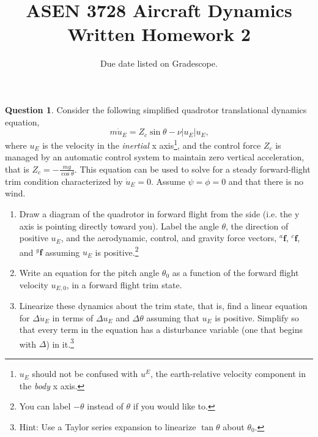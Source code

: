 \documentclass{article}
\title{ASEN 3728 Aircraft Dynamics\\Written Homework 2}
\date{Due date listed on Gradescope.}
\theoremstyle{definition}
\newtheorem{question}{Question}
\begin{document}

\maketitle

\begin{question}
    Consider the following simplified quadrotor translational dynamics equation,
    \begin{equation*}
        m\dot{u}_E = Z_c\sin\theta-\nu |u_E| u_E \text{,}
    \end{equation*}
    where $u_E$ is the velocity in the \emph{inertial} x axis\footnote{$u_E$ should not be confused with $u^E$, the earth-relative velocity component in the \emph{body} x axis.}, and the control force $Z_c$ is managed by an automatic control system to maintain zero vertical acceleration, that is $Z_c=-\frac{mg}{\cos\theta}$. This equation can be used to solve for a steady forward-flight trim condition characterized by $\dot{u}_E = 0$. Assume $\psi=\phi=0$ and that there is no wind.

\begin{enumerate}[label=\alph*),nosep]
    \item Draw a diagram of the quadrotor in forward flight from the side (i.e. the y axis is pointing directly toward you). Label the angle $\theta$, the direction of positive $u_E$, and the aerodynamic, control, and gravity force vectors, $^a\mathbf{f}$, $^c\mathbf{f}$, and $^g\mathbf{f}$ assuming $u_E$ is positive.\footnote{You can label $-\theta$ instead of $\theta$ if you would like to.}
    \item Write an equation for the pitch angle $\theta_0$ as a function of the forward flight velocity $u_{E,0}$, in a forward flight trim state.
    \item Linearize these dynamics about the trim state, that is, find a linear equation for $\Delta \dot{u}_E$ in terms of $\Delta u_E$ and $\Delta \theta$ assuming that $u_E$ is positive. Simplify so that every term in the equation has a disturbance variable (one that begins with $\Delta$) in it.\footnote{Hint: Use a Taylor series expansion to linearize $\tan\theta$ about $\theta_0$.}
\end{enumerate}

\end{question}
\vspace{0.1cm}
\clearpage
\end{document}
